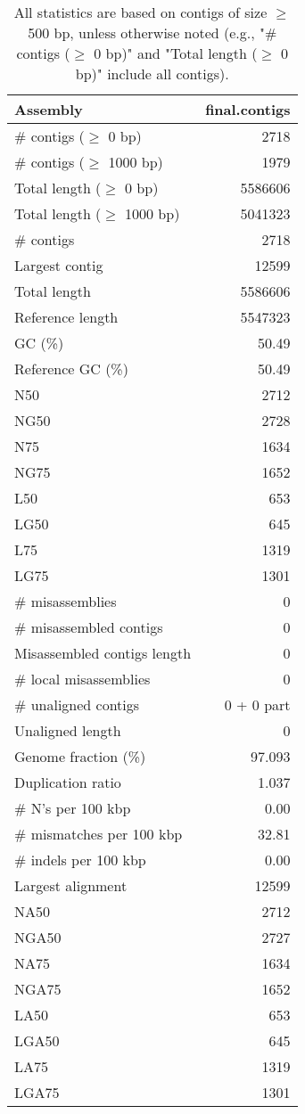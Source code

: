 \documentclass[12pt,a4paper]{article}
\begin{document}
\begin{table}[ht]
\begin{center}
\caption{All statistics are based on contigs of size $\geq$ 500 bp, unless otherwise noted (e.g., "\# contigs ($\geq$ 0 bp)" and "Total length ($\geq$ 0 bp)" include all contigs).}
\begin{tabular}{|l*{1}{|r}|}
\hline
Assembly & final.contigs \\ \hline
\# contigs ($\geq$ 0 bp) & 2718 \\ \hline
\# contigs ($\geq$ 1000 bp) & 1979 \\ \hline
Total length ($\geq$ 0 bp) & 5586606 \\ \hline
Total length ($\geq$ 1000 bp) & 5041323 \\ \hline
\# contigs & 2718 \\ \hline
Largest contig & 12599 \\ \hline
Total length & 5586606 \\ \hline
Reference length & 5547323 \\ \hline
GC (\%) & 50.49 \\ \hline
Reference GC (\%) & 50.49 \\ \hline
N50 & 2712 \\ \hline
NG50 & 2728 \\ \hline
N75 & 1634 \\ \hline
NG75 & 1652 \\ \hline
L50 & 653 \\ \hline
LG50 & 645 \\ \hline
L75 & 1319 \\ \hline
LG75 & 1301 \\ \hline
\# misassemblies & 0 \\ \hline
\# misassembled contigs & 0 \\ \hline
Misassembled contigs length & 0 \\ \hline
\# local misassemblies & 0 \\ \hline
\# unaligned contigs & 0 + 0 part \\ \hline
Unaligned length & 0 \\ \hline
Genome fraction (\%) & 97.093 \\ \hline
Duplication ratio & 1.037 \\ \hline
\# N's per 100 kbp & 0.00 \\ \hline
\# mismatches per 100 kbp & 32.81 \\ \hline
\# indels per 100 kbp & 0.00 \\ \hline
Largest alignment & 12599 \\ \hline
NA50 & 2712 \\ \hline
NGA50 & 2727 \\ \hline
NA75 & 1634 \\ \hline
NGA75 & 1652 \\ \hline
LA50 & 653 \\ \hline
LGA50 & 645 \\ \hline
LA75 & 1319 \\ \hline
LGA75 & 1301 \\ \hline
\end{tabular}
\end{center}
\end{table}
\end{document}
